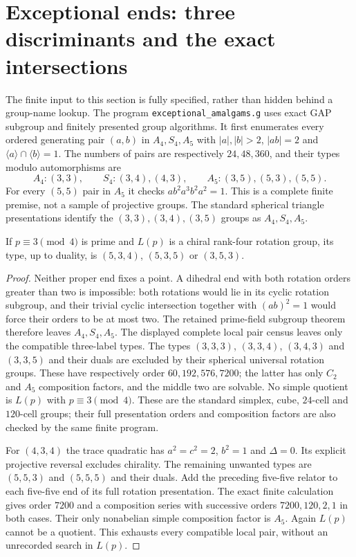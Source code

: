 \section{Exceptional ends: three discriminants and the exact intersections}
The finite input to this section is fully specified, rather than hidden
behind a group-name lookup. The program \texttt{exceptional\_amalgams.g}
uses exact GAP subgroup and finitely presented group algorithms. It first
enumerates every ordered generating pair $(a,b)$ in $A_4,S_4,A_5$ with
$|a|,|b|>2$, $|ab|=2$ and $\langle a\rangle\cap\langle b\rangle=1$.
The numbers of pairs are respectively $24,48,360$, and their types modulo
automorphisms are
\[
 A_4:(3,3),\qquad S_4:(3,4),(4,3),\qquad
 A_5:(3,5),(5,3),(5,5).
\]
For every $(5,5)$ pair in $A_5$ it checks
$a b^2a^3b^2a^2=1$. This is a complete finite premise, not a sample of
projective groups. The standard spherical triangle presentations identify
the $(3,3),(3,4),(3,5)$ groups as $A_4,S_4,A_5$.

\begin{lemma}\label{E.ExceptionalTypes}
If $p\equiv3\pmod4$ is prime and $L(p)$ is a chiral rank-four rotation
group, its type, up to duality, is $(5,3,4)$, $(5,3,5)$ or $(3,5,3)$.
\end{lemma}
\begin{proof}
Neither proper end fixes a point. A dihedral end with both rotation
orders greater than two is impossible: both rotations would lie in its
cyclic rotation subgroup, and their trivial cyclic intersection together
with $(ab)^2=1$ would force their orders to be at most two. The retained
prime-field subgroup theorem therefore leaves $A_4,S_4,A_5$.
The displayed complete local pair census leaves only the compatible
three-label types. The types $(3,3,3)$, $(3,3,4)$, $(3,4,3)$ and
$(3,3,5)$ and their duals are excluded by their spherical universal
rotation groups. These have respectively order $60,192,576,7200$;
the latter has only $C_2$ and $A_5$ composition factors, and the middle
two are solvable. No simple quotient is $L(p)$ with $p\equiv3\pmod4$.
These are the standard simplex, cube, $24$-cell and $120$-cell groups;
their full presentation orders and composition factors are also checked
by the same finite program.

For $(4,3,4)$ the trace quadratic has $a^2=c^2=2$, $b^2=1$ and
$\Delta=0$. Its explicit projective reversal excludes chirality.
The remaining unwanted types are $(5,5,3)$ and $(5,5,5)$ and their duals.
Add the preceding five-five relator to each five-five end of its full
rotation presentation. The exact finite calculation gives order $7200$
and a composition series with successive orders $7200,120,2,1$ in both
cases. Their only nonabelian simple composition factor is $A_5$.
Again $L(p)$ cannot be a quotient. This exhausts every compatible local
pair, without an unrecorded search in $L(p)$.
\end{proof}

